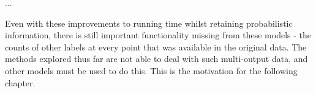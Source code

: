 ...

Even with these improvements to running time whilst retaining probabilistic information, there is still important functionality missing from these models - the counts of other labels at every point that was available in the original data. The methods explored thus far are not able to deal with such multi-output data, and other models must be used to do this. This is the motivation for the following chapter.
